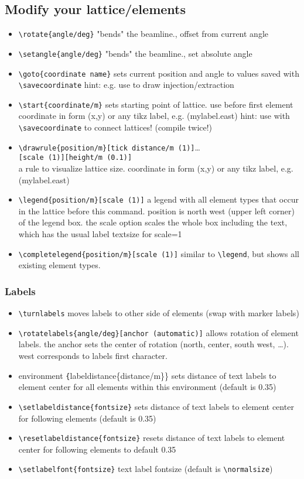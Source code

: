 \documentclass[colorlinks]{scrartcl}
\begin{document}
\subsection{Modify your lattice/elements}
\label{sec-5-2}
\begin{itemize}
\item \verb+\rotate{angle/deg}+ "bends" the beamline., offset from current angle
\item \verb+\setangle{angle/deg}+ "bends" the beamline., set absolute angle
\item \verb+\goto{coordinate name}+ sets current position and angle to values saved with \verb+\savecoordinate+
hint: e.g. use to draw injection/extraction
\item \verb+\start{coordinate/m}+ sets starting point of lattice. use before first element
coordinate in form (x,y) or any tikz label, e.g. (mylabel.east)
hint: use with \verb+\savecoordinate+ to connect lattices! (compile twice!)
\item \verb+\drawrule{position/m}[tick distance/m (1)]+\ldots{}\\ \verb+[scale (1)][height/m (0.1)]+\\  a rule to visualize lattice size. coordinate in form (x,y) or any tikz label, e.g. (mylabel.east)
\item \verb+\legend{position/m}[scale (1)]+ a legend with all element types that occur in the lattice before this command.
position is north west (upper left corner) of the legend box.
the scale option scales the whole box including the text, which has the usual label textsize for scale=1
\item \verb+\completelegend{position/m}[scale (1)]+ similar to \verb+\legend+, but shows all existing element types.
\end{itemize}
\subsubsection{Labels}
\label{sec-5-2-1}
\begin{itemize}
\item \verb+\turnlabels+ moves labels to other side of elements (swap with marker labels)
\item \verb+\rotatelabels{angle/deg}[anchor (automatic)]+ allows rotation of element labels.
the anchor sets the center of rotation (north, center, south west, \ldots{}). west corresponds to labels first character.
\item environment \texttt\{labeldistance\{distance/m\}\} sets distance of text labels to element center for all elements within this environment (default is 0.35)
\item \verb+\setlabeldistance{fontsize}+ sets distance of text labels to element center for following elements (default is 0.35)
\item \verb+\resetlabeldistance{fontsize}+ resets distance of text labels to element center for following elements to default 0.35
\item \verb+\setlabelfont{fontsize}+ text label fontsize (default is \verb+\normalsize+)
\end{itemize}
\end{document}
